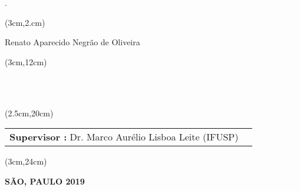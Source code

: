 \begin{titlepage}.
    

    \vspace{3.5cm}

    
    \begin{textblock*}{15cm}(3cm,2.cm)
        \makeatletter
        \begin{huge}
            \begin{center}
                \color{black}
                 Renato Aparecido Negrão de Oliveira\\ 
            \end{center}
         \end{huge}
     
    \end{textblock*}
    
    \begin{textblock*}{15cm}(3cm,12cm)
        \begin{Huge}
            \begin{center}
                \makeatletter
                \noindent\textcolor{white}{Desenvolvimento de um detector de silício frontal para a medida de trajetórias e tempo no experimento ATLAS-LHC}
                \makeatother
            \end{center}
        \end{Huge}
    \end{textblock*}

    \begin{textblock*}{15cm}(2.5cm,20cm)
        \makeatletter
        \begin{LARGE}
            \setcellgapes{4pt}
            \makegapedcells
            {\color{black}\begin{tabularx}{15cm}{XX}
                \textbf{Supervisor :} Dr. Marco Aurélio Lisboa Leite (IFUSP)\\ 
            \end{tabularx}}
        \end{LARGE}
        \makeatother
    \end{textblock*}
    
    \begin{textblock*}{15cm}(3cm,24cm)
        \makeatletter
        \begin{center}
            {\color{black}
                \textbf{SÃO, PAULO 2019} 
            }
        \end{center}
        \makeatother
    \end{textblock*}

\end{titlepage}

